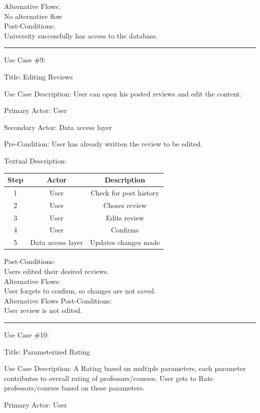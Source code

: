 \documentclass{article}
\begin{document}
Alternative Flows:\\
	No alternative flow\\
	Post-Conditions:\\
University successfully has access to the database.\\

\hrule 

Use Case \#9: 

	Title: Editing Reviews

	Use Case Description: User can open his posted reviews and edit the content.

	Primary Actor: User

	Secondary Actor: Data access layer

	Pre-Condition: User has already written the review to be edited.

	Textual Description:


\begin{center}
\begin{tabular}{|c|c|c|}
  \hline
  Step & 
  Actor & 
Description \\ \hline
  1 & 
  User &
Check for post history \\
  2 &
  User &
Choses review \\
  3 &
  User &
Edits review \\
  4 &
  User &
Confirms  \\
  5 &
  Data access layer &
Updates changes made \\  \hline
\end{tabular} 
\end{center}

Post-Conditions:\\ 
Users edited their desired reviews. \\
Alternative Flows:\\
	User forgets to confirm, so changes are not saved.\\
	Alternative Flows Post-Conditions: \\
	User review is not edited. \\

  \hrule

Use Case \#10: 

	Title: Parameterized Rating

  Use Case Description: A Rating based on multiple parameters, each parameter contributes to overall rating of professors/courses. User gets to Rate professors/courses based on these parameters.
	
  Primary Actor: User
	
\end{document}
